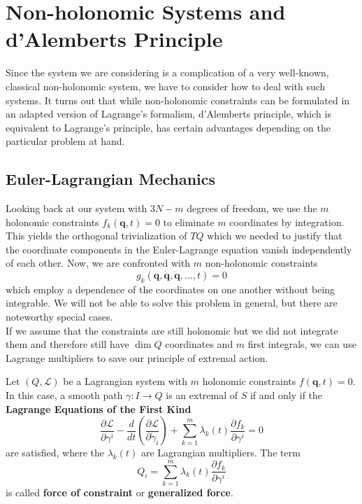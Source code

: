 \section{Non-holonomic Systems and d'Alemberts Principle}
Since the system we are considering is a complication of a very well-known, classical non-holonomic system, we have to consider how to deal with such systems. It turns out that while non-holonomic constraints can be formulated in an adapted version of Lagrange's formalism, d'Alemberts principle, which is equivalent to Lagrange's principle, has certain advantages depending on the particular problem at hand.
\subsection{Euler-Lagrangian Mechanics}
Looking back at our system with $3N-m$ degrees of freedom, we use the $m$ holonomic constraints $f_k(\mathbf{q},t)=0$ to eliminate $m$ coordinates by integration. This yields the orthogonal trivialization of $TQ$ which we needed to justify that the coordinate components in the Euler-Lagrange equation vanish independently of each other. Now, we are confronted with $m$ non-holonomic constraints \[
g_k(\mathbf{q}, \dot{\mathbf{q}}, \ddot{\mathbf{q}}, \dots, t)=0
\] which employ a dependence of the coordinates on one another without being integrable. We will not be able to solve this problem in general, but there are noteworthy special cases.\\
If we assume that the constraints are still holonomic but we did not integrate them and therefore still have $\dim Q$ coordinates and $m$ first integrals, we can use Lagrange multipliers to save our principle of extremal action.
\begin{theorem}
    Let $(Q, \mathcal{L})$ be a Lagrangian system with $m$ holonomic constraints $f(\mathbf{q},t)=0$. In this case, a smooth path $\gamma: I \to Q$ is an extremal of $S$ if and only if the \textbf{Lagrange Equations of the First Kind}
    \[
        \frac{\partial \mathcal{L}}{\partial \gamma^i} - \frac{d}{dt} \left( \frac{\partial \mathcal{L}}{\partial \dot{\gamma}_i}\right) + \sum_{k=1}^m \lambda_k(t) \frac{\partial f_k}{\partial \gamma^i}=0
    \] are satisfied, where the $\lambda_k(t)$ are Lagrangian multipliers. The term 
    \[
        Q_i = \sum_{k=1}^m \lambda_k(t) \frac{\partial f_k}{\partial \gamma^i}
    \] is called \textbf{force of constraint} or \textbf{generalized force}. 
\end{theorem}
